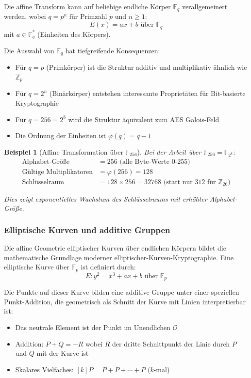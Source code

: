 ﻿\documentclass[12pt,a4paper]{article}
\newtheorem{example}{Beispiel}
\begin{document}
	Die affine Transform kann auf beliebige endliche Körper $\mathbb{F}_q$ verallgemeinert werden, wobei $q = p^n$ für Primzahl $p$ und $n \geq 1$:
	\begin{equation}
		E(x) = ax + b \text{ über } \mathbb{F}_q
	\end{equation}
	mit $a \in \mathbb{F}_q^*$ (Einheiten des Körpers).
	
	Die Auswahl von $\mathbb{F}_q$ hat tiefgreifende Konsequenzen:
	\begin{itemize}
		\item Für $q = p$ (Primkörper) ist die Struktur additiv und multiplikativ ähnlich wie $\mathbb{Z}_p$
		\item Für $q = 2^n$ (Binärkörper) entstehen interessante Proprietäten für Bit-basierte Kryptographie
		\item Für $q = 256 = 2^8$ wird die Struktur äquivalent zum AES Galois-Feld
		\item Die Ordnung der Einheiten ist $\varphi(q) = q - 1$
	\end{itemize}
	
	\begin{example}[Affine Transformation über $\mathbb{F}_{256}$]
		Bei der Arbeit über $\mathbb{F}_{256} = \mathbb{F}_{2^8}$:
		\begin{align}
			\text{Alphabet-Größe} &= 256 \text{ (alle Byte-Werte 0-255)} \\
			\text{Gültige Multiplikatoren} &= \varphi(256) = 128 \\
			\text{Schlüsselraum} &= 128 \times 256 = 32768 \text{ (statt nur 312 für } \mathbb{Z}_{26})
		\end{align}
		
		Dies zeigt exponentielles Wachstum des Schlüsselraums mit erhöhter Alphabet-Größe.
	\end{example}
	
	\subsubsection{Elliptische Kurven und additive Gruppen}
	
	Die affine Geometrie elliptischer Kurven über endlichen Körpern bildet die mathematische Grundlage moderner elliptischer-Kurven-Kryptographie. Eine elliptische Kurve über $\mathbb{F}_p$ ist definiert durch:
	\begin{equation}
		E: y^2 = x^3 + ax + b \text{ über } \mathbb{F}_p
	\end{equation}
	
	Die Punkte auf dieser Kurve bilden eine additive Gruppe unter einer speziellen Punkt-Addition, die geometrisch als Schnitt der Kurve mit Linien interpretierbar ist:
	\begin{itemize}
		\item Das neutrale Element ist der Punkt im Unendlichen $\mathcal{O}$
		\item Addition: $P + Q = -R$ wobei $R$ der dritte Schnittpunkt der Linie durch $P$ und $Q$ mit der Kurve ist
		\item Skalares Vielfaches: $[k]P = P + P + \cdots + P$ ($k$-mal)
	\end{itemize}
	
\end{document}
